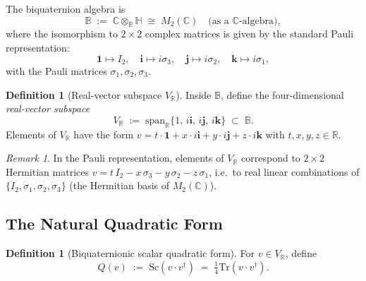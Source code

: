 \documentclass[12pt]{article}
\theoremstyle{definition}
\newtheorem{definition}[theorem]{Definition}
\theoremstyle{remark}
\newtheorem{remark}[theorem]{Remark}
\begin{document}
The biquaternion algebra is
\begin{equation}
  \mathbb{B} \;:=\; \mathbb{C}\otimes_{\mathbb{R}}\mathbb{H}
  \;\cong\; M_2(\mathbb{C})
  \quad\text{(as a $\mathbb{C}$-algebra)},
  \label{eq:biquaternion_algebra}
\end{equation}
where the isomorphism to $2\times 2$ complex matrices is given by the standard
Pauli representation:
\begin{equation}
  \mathbf{1}\mapsto I_2,\quad
  \mathbf{i}\mapsto i\sigma_3,\quad
  \mathbf{j}\mapsto i\sigma_2,\quad
  \mathbf{k}\mapsto i\sigma_1,
  \label{eq:pauli_rep}
\end{equation}
with the Pauli matrices $\sigma_1,\sigma_2,\sigma_3$.

\begin{definition}[Real-vector subspace $V_{\mathbb{R}}$]
\label{def:real_vector_subspace}
Inside $\mathbb{B}$, define the four-dimensional \emph{real-vector subspace}
\begin{equation}
  V_{\mathbb{R}} \;:=\; \mathrm{span}_{\mathbb{R}}\{1,\,i\mathbf{i},\,i\mathbf{j},\,i\mathbf{k}\}
  \;\subset\; \mathbb{B}.
  \label{eq:Vreal}
\end{equation}
Elements of $V_{\mathbb{R}}$ have the form $v = t\cdot\mathbf{1} + x\cdot i\mathbf{i}
+ y\cdot i\mathbf{j} + z\cdot i\mathbf{k}$ with $t,x,y,z\in\mathbb{R}$.
\end{definition}

\begin{remark}
In the Pauli representation, elements of $V_{\mathbb{R}}$ correspond to $2\times 2$
Hermitian matrices $v = t\,I_2 - x\,\sigma_3 - y\,\sigma_2 - z\,\sigma_1$,
i.e.\ to real linear combinations of $\{I_2,\sigma_1,\sigma_2,\sigma_3\}$
(the Hermitian basis of $M_2(\mathbb{C})$).
\end{remark}

\subsection{The Natural Quadratic Form}

\begin{definition}[Biquaternionic scalar quadratic form]
\label{def:quad_form}
For $v\in V_{\mathbb{R}}$, define
\begin{equation}
  Q(v) \;:=\; \mathrm{Sc}(v\cdot v^\dagger)
  \;=\; \tfrac{1}{4}\mathrm{Tr}(v\cdot v^\dagger).
  \label{eq:quad_form}
\end{equation}
\end{definition}
\end{document}
